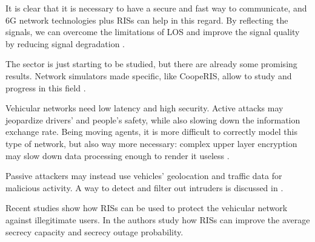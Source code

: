 It is clear that it is necessary to have a secure and fast way to communicate, and 6G network technologies plus RISs can help in this regard. By reflecting the signals, we can overcome the limitations of LOS and improve the signal quality by reducing signal degradation \cite{10715713}.

The sector is just starting to be studied, but there are already some promising results. Network simulators made specific, like CoopeRIS, allow to study and progress in this field \cite{SEGATA2024110443}.

Vehicular networks need low latency and high security. Active attacks may jeopardize drivers' and people's safety, while also slowing down the information exchange rate. Being moving agents, it is more difficult to correctly model this type of network, but also way more necessary: complex upper layer encryption may slow down data processing enough to render it useless \cite{8403278}.

Passive attackers may instead use vehicles' geolocation and traffic data for malicious activity. A way to detect and filter out intruders is discussed in \cite{8474336}.

Recent studies show how RISs can be used to protect the vehicular network against illegitimate users. In \cite{makarfi2020reconfigurableintelligentsurfacesenabledvehicular} the authors study how RISs can improve the average secrecy capacity and secrecy outage probability.